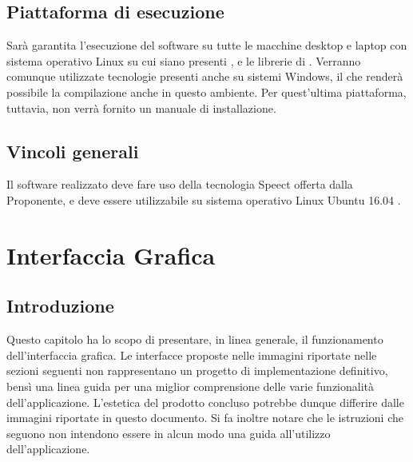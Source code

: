 \documentclass[../AnalisideiRequisiti.tex]{subfiles}
\begin{document}
\section{Piattaforma di esecuzione}
Sarà garantita l'esecuzione del software su tutte le macchine desktop e laptop con sistema operativo Linux su cui siano presenti ,  e le librerie di . Verranno comunque utilizzate tecnologie presenti anche su sistemi Windows, il che renderà possibile la compilazione anche in questo ambiente. Per quest'ultima piattaforma, tuttavia, non verrà fornito un manuale di installazione.

\section{Vincoli generali}
Il software realizzato deve fare uso della tecnologia Speect offerta dalla Proponente, e deve essere utilizzabile su sistema operativo Linux Ubuntu 16.04 .
	

\chapter{Interfaccia Grafica}

\section{Introduzione}

Questo capitolo ha lo scopo di presentare, in linea generale, il funzionamento dell'interfaccia grafica. Le interfacce proposte nelle immagini riportate nelle sezioni seguenti non rappresentano un progetto di implementazione definitivo, bensì una linea guida per una miglior comprensione delle varie funzionalità dell'applicazione. L'estetica del prodotto concluso potrebbe dunque differire dalle immagini riportate in questo documento. Si fa inoltre notare che le istruzioni che seguono non intendono essere in alcun modo una guida all'utilizzo dell'applicazione.
\end{document}
